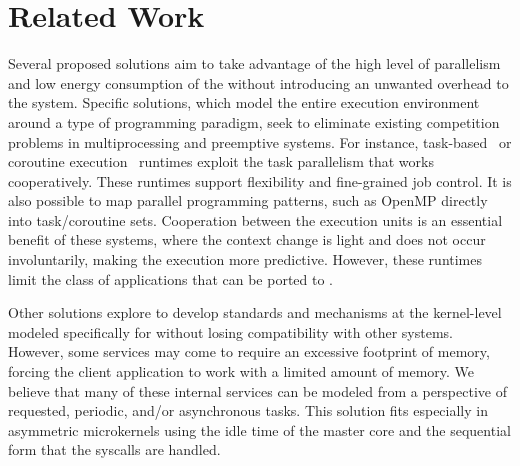 \section{Related Work}
\label{sec:related-work}

	Several proposed solutions aim to take advantage of the high level of
	parallelism and low energy consumption of the \lws without introducing an
	unwanted overhead to the system.
	Specific solutions, which model the entire execution environment around
	a type of programming paradigm, seek to eliminate existing competition problems
	in multiprocessing and preemptive systems. For instance,
	task-based~\cite{Zhou:coroutine} or coroutine execution~\cite{Cesarini:task}
	runtimes exploit the task parallelism that works cooperatively. These runtimes
	support flexibility and fine-grained job control.  It is also possible to map
	parallel programming patterns, such as OpenMP directly into task/coroutine
	sets. Cooperation between the execution units is an essential benefit of these
	systems, where the context change is light and does not occur involuntarily,
	making the execution more predictive. However, these runtimes limit the class
	of applications that can be ported to \lws.

	Other solutions explore to develop standards and mechanisms at the
	kernel-level~\cite{Penna:Microkernel} modeled specifically for \lws without
	losing compatibility with other systems. However, some \os services may come to
	require an excessive footprint of memory, forcing the client application to
	work with a limited amount of memory.
	We believe that many of these internal \os services can be modeled from
	a perspective of requested, periodic, and/or asynchronous tasks. This solution
	fits especially in asymmetric microkernels using the idle time of the master
	core and the sequential form that the syscalls are handled.

